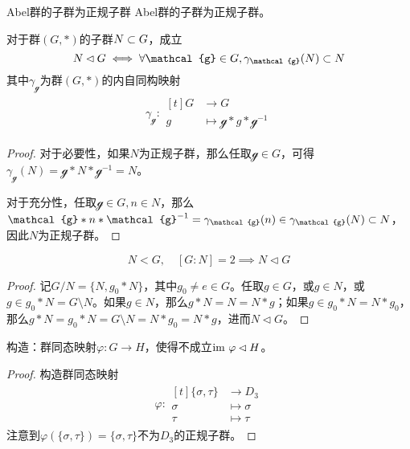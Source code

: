 \begin{proposition}{Abel群的子群为正规子群}
	Abel群的子群为正规子群。
\end{proposition}

\begin{proposition}
	对于群$(G,*)$的子群$N\subset G$，成立
	$$
	N\lhd G\iff \forall \mathcal{g}\in G,\gamma_{\mathcal{g}}(N)\sub N
	$$
	其中$\gamma_{\mathcal{g}}$为群$(G,*)$的内自同构映射
	\begin{align*}
		\gamma_\mathcal{g}:
		\begin{aligned}[t]
			G&\longrightarrow G\\
			g&\longmapsto \mathcal{g}*g*\mathcal{g}^{-1}
		\end{aligned}
	\end{align*}
\end{proposition}

\begin{proof}
	对于必要性，如果$N$为正规子群，那么任取$\mathcal{g}\in G$，可得$\gamma_{\mathcal{g}}(N)=\mathcal{g}*N*\mathcal{g}^{-1}=N$。
	
	对于充分性，任取$\mathcal{g}\in G,n\in N$，那么$\mathcal{g}*n*\mathcal{g}^{-1}=\gamma_{\mathcal{g}}(n)\in\gamma_{\mathcal{g}}(N)\sub N$，因此$N$为正规子群。
\end{proof}

\begin{proposition}
	$$
	N<G,\quad [G:N]=2\implies N\lhd G
	$$
\end{proposition}

\begin{proof}
	记$G/N=\{ N,g_0*N \}$，其中$g_0\ne e\in G$。任取$g\in G$，或$g\in N$，或$g\in g_0*N=G\setminus N$。如果$g\in N$，那么$g*N=N=N*g$；如果$g\in g_0*N=N*g_0$，那么$g*N=g_0*N=G\setminus N=N*g_0=N*g$，进而$N\lhd G$。
\end{proof}

\begin{example}
	构造：群同态映射$\varphi:G\to H$，使得不成立$\text{im } \varphi\lhd H$。
\end{example}

\begin{proof}
	构造群同态映射
	\begin{align*}
		\varphi:\begin{aligned}[t]
			\{\sigma,\tau\}&\longrightarrow D_3\\
			\sigma&\longmapsto \sigma\\
			\tau&\longmapsto \tau
		\end{aligned}
	\end{align*}
	注意到$\varphi(\{\sigma,\tau\})=\{\sigma,\tau\}$不为$D_3$的正规子群。
\end{proof}

